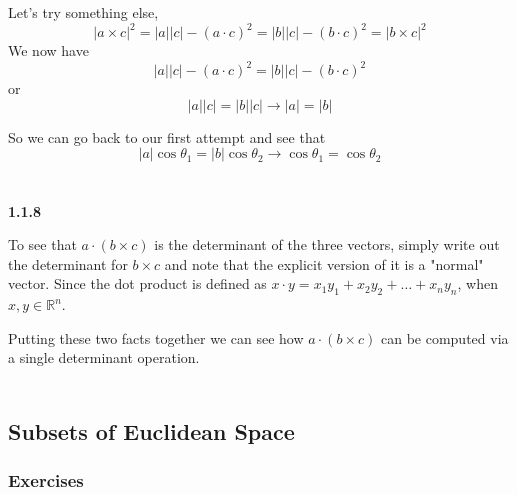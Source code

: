 Let's try something else,
$$
|a\times c|^2 = |a||c| - (a\cdot c)^2
= |b||c| - (b\cdot c)^2 = |b \times c|^2
$$
We now have
$$
|a||c| - (a\cdot c)^2 = |b||c| - (b\cdot c)^2
$$
or
$$
|a||c| = |b||c| \rightarrow |a| = |b|
$$

So we can go back to our first attempt and see that
$$
|a| \cos{\theta_1} = |b| \cos{\theta_2} \rightarrow \cos{\theta_1} = \cos{\theta_2}
$$
\\~\\



\textbf{1.1.8}

To see that $a\cdot(b\times c)$ is the determinant of the three vectors,
simply write out the determinant for $b\times c$ and note that the explicit version of it
is a "normal" vector.
Since the dot product is defined as $x\cdot y = x_1 y_1 + x_2 y_2 + \ldots + x_n y_n$, when
$x, y \in \mathbb{R}^n$.

Putting these two facts together we can see how $a\cdot(b\times c)$ can be computed via a single determinant
operation.
\\~\\



\subsection{Subsets of Euclidean Space}

\subsubsection{Exercises}